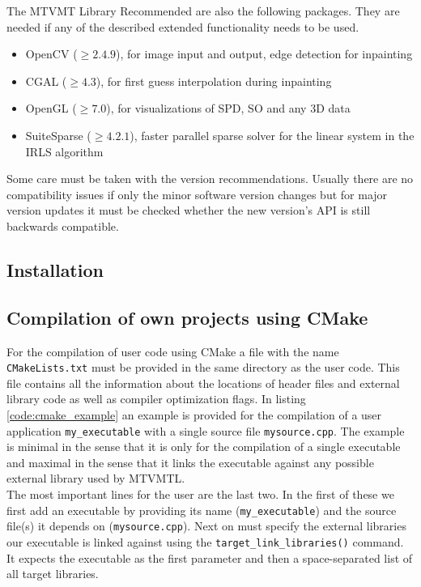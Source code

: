 \begin{chapter}{The MTVMT Library}
Recommended are also the following packages. They are needed if any of the described extended functionality needs to be used.
\begin{itemize}
    \item OpenCV ($\geq 2.4.9$), for image input and output, edge detection for inpainting
    \item CGAL ($\geq 4.3$), for first guess interpolation during inpainting
    \item OpenGL ($\geq 7.0$), for visualizations of SPD, SO and any 3D data
    \item SuiteSparse ($\geq 4.2.1$), faster parallel sparse solver for the linear system in the IRLS algorithm
\end{itemize}
Some care must be taken with the version recommendations. Usually there are no compatibility issues if only the minor software version changes but for major version updates it must
be checked whether the new version's API is still backwards compatible.


\subsection{Installation} %
\label{sub:Installation}


\subsection{Compilation of own projects using CMake} %
\label{sub:CMakeCompilation}
For the compilation of user code using CMake a file with the name \texttt{CMakeLists.txt} must be provided in the same directory as the user code. 
This file contains all the information about the locations of header files and external library code as well as compiler optimization flags. In listing \ref{code:cmake_example} 
an example is provided for the compilation of a user application \texttt{my\_executable} with a single source file \texttt{mysource.cpp}. 
The example is minimal in the sense that it is only for the compilation of a single executable and maximal in the sense that it
links the executable against any possible external library used by MTVMTL.\\

The most important lines for the user are the last two. In the first of these we first add an executable by providing its name (\texttt{my\_executable}) and the source file(s) it depends on 
(\texttt{mysource.cpp}). Next on must specify the external libraries our executable is linked against using the \texttt{target\_link\_libraries()} command. It expects the executable
as the first parameter and then a space-separated list of all target libraries. \\


\end{chapter}
